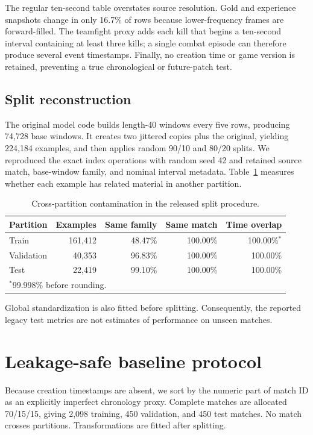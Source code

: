 \documentclass[10pt]{article}
\begin{document}
The regular ten-second table overstates source resolution. Gold and experience
snapshots change in only 16.7\% of rows because lower-frequency frames are
forward-filled. The teamfight proxy adds each kill that begins a ten-second
interval containing at least three kills; a single combat episode can therefore
produce several event timestamps. Finally, no creation time or game version is
retained, preventing a true chronological or future-patch test.

\subsection{Split reconstruction}

The original model code builds length-40 windows every five rows, producing
74,728 base windows. It creates two jittered copies plus the original, yielding
224,184 examples, and then applies random 90/10 and 80/20 splits. We reproduced
the exact index operations with random seed 42 and retained source match,
base-window family, and nominal interval metadata. Table~\ref{tab:contamination}
measures whether each example has related material in another partition.

\begin{table}[ht]
\centering
\caption{Cross-partition contamination in the released split procedure.}
\label{tab:contamination}
\begin{tabular}{lrrrr}
\toprule
Partition & Examples & Same family & Same match & Time overlap \\
\midrule
Train      & 161,412 & 48.47\% & 100.00\% & 100.00\%$^{*}$ \\
Validation &  40,353 & 96.83\% & 100.00\% & 100.00\% \\
Test       &  22,419 & 99.10\% & 100.00\% & 100.00\% \\
\bottomrule
\multicolumn{5}{l}{\footnotesize $^{*}$99.998\% before rounding.}
\end{tabular}
\end{table}

Global standardization is also fitted before splitting. Consequently, the
reported legacy test metrics are not estimates of performance on unseen
matches.

\section{Leakage-safe baseline protocol}

Because creation timestamps are absent, we sort by the numeric part of match
ID as an explicitly imperfect chronology proxy. Complete matches are allocated
70/15/15, giving 2,098 training, 450 validation, and 450 test matches. No match
crosses partitions. Transformations are fitted after splitting.
\end{document}
